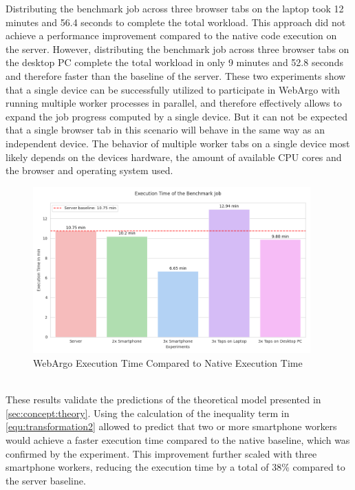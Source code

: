 Distributing the benchmark job across three browser tabs on the laptop took 12 minutes and 56.4 seconds to complete the total workload. This approach did not achieve a performance improvement compared to the native code execution on the server. However, distributing the benchmark job across three browser tabs on the desktop \ac{PC} complete the total workload in only 9 minutes and 52.8 seconds and therefore faster than the baseline of the server. These two experiments show that a single device can be successfully utilized to participate in WebArgo with running multiple worker processes in parallel, and therefore effectively allows to expand the job progress computed by a single device. But it can not be expected that a single browser tab in this scenario will behave in the same way as an independent device. The behavior of multiple worker tabs on a single device most likely depends on the devices hardware, the amount of available \acs{CPU} cores and the browser and operating system used.
\begin{figure}[htbp]
    \centering
    \includegraphics[width=0.95\textwidth]{gfx/figures/Evaluation_A.png}
    \caption{WebArgo Execution Time Compared to Native Execution Time}
    \label{fig:evaluation:experiment-A}
\end{figure}
~\\
These results validate the predictions of the theoretical model presented in \autoref{sec:concept:theory}. Using the calculation of the inequality term in \eqref{equ:transformation2} allowed to predict that two or more smartphone workers would achieve a faster execution time compared to the native baseline, which was confirmed by the experiment. This improvement further scaled with three smartphone workers, reducing the execution time by a total of 38\% compared to the server baseline.


